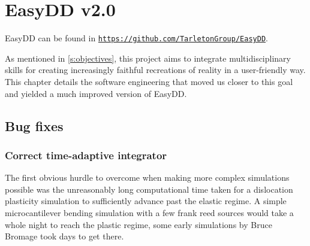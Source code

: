 \chapter{EasyDD v2.0}
\label{c:easydd}

EasyDD can be found in \href{https://github.com/TarletonGroup/EasyDD}{\texttt{https://github.com/TarletonGroup/EasyDD}}.

As mentioned in \cref{s:objectives}, this project aims to integrate multidisciplinary skills for creating increasingly faithful recreations of reality in a user-friendly way. This chapter details the software engineering that moved us closer to this goal and yielded a much improved version of EasyDD.

\section{Bug fixes}
\label{s:bugs}

\subsection{Correct time-adaptive integrator}
\label{ss:integrator}

The first obvious hurdle to overcome when making more complex simulations possible was the unreasonably long computational time taken for a dislocation plasticity simulation to sufficiently advance past the elastic regime. A simple microcantilever bending simulation with a few frank reed sources would take a whole night to reach the plastic regime, some early simulations by Bruce Bromage took days to get there.

